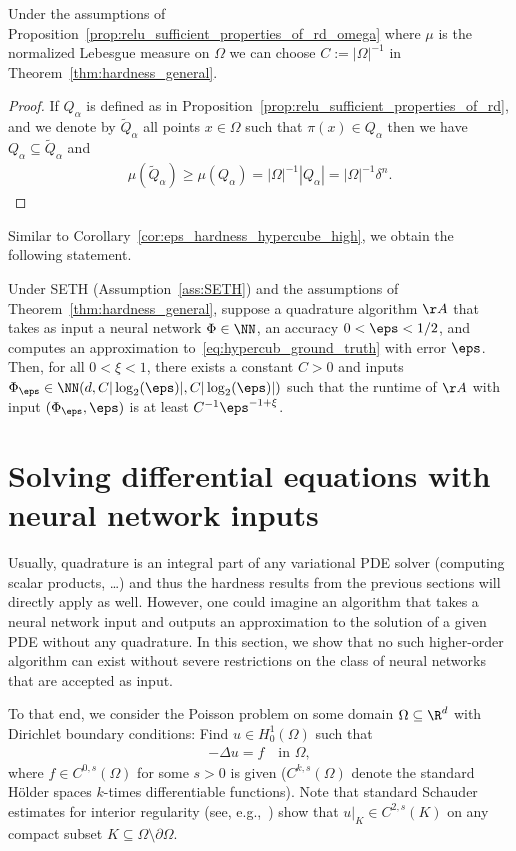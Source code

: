 \documentclass{amsart}[11pt]
\numberwithin{equation}{section}
\numberwithin{theorem}{section}
\begin{document}
\begin{corollary}
    Under the assumptions of Proposition~\ref{prop:relu_sufficient_properties_of_rd_omega} where $\mu$ is the normalized Lebesgue measure on $\Omega$ we can choose $C := |\Omega|^{-1}$ in Theorem~\ref{thm:hardness_general}.
\end{corollary}
\begin{proof}
    If $Q_\alpha$ is defined as in Proposition~\ref{prop:relu_sufficient_properties_of_rd}, and we denote by $\widetilde{Q}_\alpha$ all points $x \in \Omega$ such that $\pi(x) \in Q_\alpha$ then we have $Q_\alpha \subseteq \widetilde{Q}_\alpha$ and 
    \begin{align*}
        \mu\left(\widetilde{Q}_\alpha\right) \geq \mu\left(Q_\alpha\right) = |\Omega|^{-1} |Q_\alpha| = |\Omega|^{-1} \delta^n.
    \end{align*}
\end{proof}
Similar to Corollary~\ref{cor:eps_hardness_hypercube_high}, we obtain the following statement.
\begin{corollary}
    Under SETH (Assumption~\ref{ass:SETH}) and the assumptions of Theorem~\ref{thm:hardness_general}, suppose a quadrature algorithm $\AA$ that takes as input a neural network $\Phi \in \NN$, an accuracy $0 < \eps < 1/2$, and computes an approximation to~\eqref{eq:hypercub_ground_truth} with error $\eps$. Then, for all $0 < \xi < 1$, there exists a constant $C > 0$ and inputs $\Phi_\eps\in \NN(d,C |\log_2(\eps)|, C |\log_2(\eps)|)$ such that the runtime of $\AA$ with input $(\Phi_\eps,\eps)$ is at least $C^{-1} \eps^{-1+\xi}$.
\end{corollary}


\section{Solving differential equations with neural network inputs}\label{sec:pde}
Usually, quadrature is an integral part of any variational PDE solver (computing scalar products, \ldots) and thus the hardness results from the previous sections will directly apply as well.
However, one could imagine an algorithm that takes a neural network input and outputs an approximation to the solution of a given PDE without any quadrature. In this section, we show that no such higher-order algorithm can exist without severe restrictions on the class of neural networks that are accepted as input.

To that end, we consider the Poisson problem on some domain $\Omega\subseteq \R^d$ with Dirichlet boundary conditions: Find $u\in H^1_0(\Omega)$ such that
\begin{align}\label{eq:poisson}
-\Delta u = f\quad\text{in }\Omega,
\end{align}
where $f\in C^{0,s}(\Omega)$ for some $s>0$ is given ($C^{k,s}(\Omega)$ denote the standard H\"older spaces $k$-times differentiable functions). 
Note that standard Schauder estimates for interior regularity (see, e.g.,~\cite{giltrud}) show that $u|_K \in C^{2,s}(K)$ on any compact subset $K\subseteq \Omega\setminus \partial\Omega$.
\end{document}
